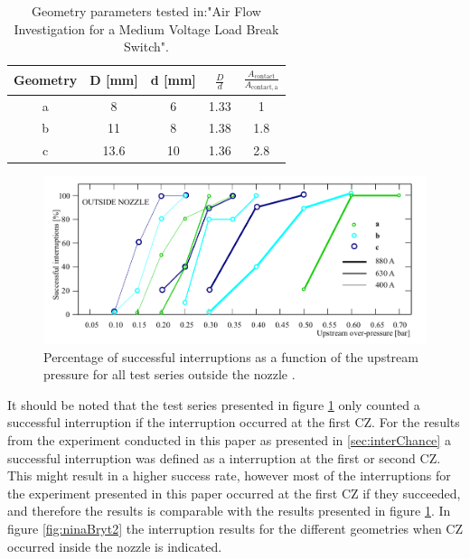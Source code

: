 \documentclass[10pt,a4paper,twoside]{article}
\begin{document}
\begin{table}[H]
\center
\caption{Geometry parameters tested in:"Air Flow Investigation for a Medium Voltage Load Break Switch".}
 \begin{tabular}{|c|c|c|c|c|}
\hline 
Geometry & D [mm] & d [mm] & $\frac{D}{d}$ & $\frac{A_\mathrm{{contact}}}{A_\mathrm{{contact,a}}}$ \\ 
\hline 
a & 8 & 6 & 1.33 & 1 \\ 
\hline 
b & 11 & 8 & 1.38 & 1.8 \\ 
\hline 
c & 13.6 & 10 & 1.36 & 2.8 \\ 
\hline 
\end{tabular} 
\label{tab:NinasGeo}
\end{table}

\begin{figure}[H]
  \centering
  \includegraphics[scale=0.4]{Bilder/Discussion/ninaResults.png}
  \caption{Percentage of successful interruptions as a function of the upstream pressure for all test series outside the nozzle \cite{bib:AFIMVLBA}.}
  \label{fig:ninaBryt}
\end{figure}

It should be noted that the test series presented in figure \ref{fig:ninaBryt} only counted a successful interruption if the interruption occurred at the first CZ. For the results from the experiment conducted in this paper as presented in \ref{sec:interChance} a successful interruption was defined as a interruption at the first or second CZ. This might result in a higher success rate, however most of the interruptions for the experiment presented in this paper occurred at the first CZ if they succeeded, and therefore the results is comparable with the results presented in figure \ref{fig:ninaBryt}. In figure \ref{fig:ninaBryt2} the interruption results for the different geometries when CZ occurred inside the nozzle is indicated.
\end{document}
